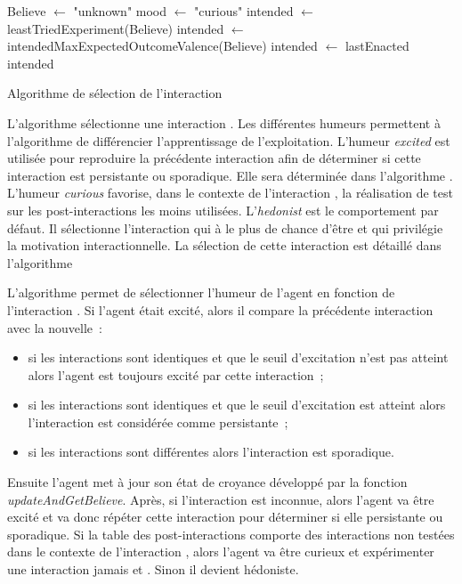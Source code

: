 \documentclass{llncs}
\begin{document}
\begin{algorithm}[h]
	
	\SetAlgoLined
	\DontPrintSemicolon
	Believe $\leftarrow$ "unknown"\;
	mood $\leftarrow$ "curious"\;
	\Func{\FGetIntend{}}
	{
		 {
			intended $\leftarrow$ leastTriedExperiment(Believe) \;
		}{
		 {
			intended $\leftarrow$ intendedMaxExpectedOutcomeValence(Believe)\;
		} {
		 {
			intended $\leftarrow$ lastEnacted\;
		}
	}
}
\KwRet intended\;
}
\caption{Algorithme de sélection de l'interaction \intended}
\label{alg:minimum_algorithm_intended}
\end{algorithm}
%
L'algorithme  sélectionne une interaction \intended. Les différentes humeurs permettent à l'algorithme de différencier l'apprentissage de l'exploitation. L'humeur \emph{excited} est utilisée pour reproduire la précédente interaction \intended afin de déterminer si cette interaction est persistante ou sporadique. Elle sera déterminée dans l'algorithme . L'humeur \emph{curious} favorise, dans le contexte de l'interaction \enacted, la réalisation de test sur les post-interactions les moins utilisées. L'\emph{hedonist} est le comportement par défaut. Il sélectionne l'interaction qui à le plus de chance d'être \enacted et qui privilégie la motivation interactionnelle. La sélection de cette interaction est détaillé dans l'algorithme 

L'algorithme  permet de sélectionner l'humeur de l'agent en fonction de l'interaction \enacted. Si l'agent était excité, alors il compare la précédente interaction \enacted avec la nouvelle~:
\begin{itemize}
	\item si les interactions sont identiques et que le seuil d'excitation n'est pas atteint alors l'agent est toujours excité par cette interaction~;
	\item si les interactions sont identiques et que le seuil d'excitation est atteint alors l'interaction est considérée comme persistante~;
	\item si les interactions sont différentes alors l'interaction \enacted est sporadique.
\end{itemize}
Ensuite l'agent met à jour son état de croyance développé par la fonction \emph{updateAndGetBelieve}. Après, si l'interaction \enacted est inconnue, alors l'agent va être excité et va donc répéter cette interaction pour déterminer si elle persistante ou sporadique. Si la table des post-interactions comporte des interactions non testées dans le contexte de l'interaction \enacted, alors l'agent va être curieux et expérimenter une interaction jamais \intend et \enact. Sinon il devient hédoniste.
\end{document}
